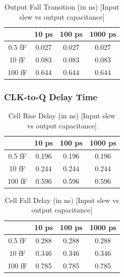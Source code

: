 \documentclass[12pt]{article}
\begin{document}
\begin{table}[H]
	\centering
	\begin{tabular}{|c|c|c|c|}
		\hline
		       & 10 ps & 100 ps & 1000 ps \\ \hline
		0.5 fF & 0.027 & 0.027  & 0.027   \\ \hline
		10 fF  & 0.083 & 0.083  & 0.083   \\ \hline
		100 fF & 0.644 & 0.644  & 0.644   \\ \hline
	\end{tabular}
	\caption{Output Fall Transition (in ns) [Input slew vs output capacitance]}
\end{table}

\subsubsection{CLK-to-Q Delay Time}

\begin{table}[H]
	\centering
	\begin{tabular}{|c|c|c|c|}
		\hline
		       & 10 ps & 100 ps & 1000 ps \\ \hline
		0.5 fF & 0.196 & 0.196  & 0.196   \\ \hline
		10 fF  & 0.244 & 0.244  & 0.244   \\ \hline
		100 fF & 0.596 & 0.596  & 0.596   \\ \hline
	\end{tabular}
	\caption{Cell Rise Delay (in ns) [Input slew vs output capacitance]}
\end{table}

\begin{table}[H]
	\centering
	\begin{tabular}{|c|c|c|c|}
		\hline
		       & 10 ps & 100 ps & 1000 ps \\ \hline
		0.5 fF & 0.288 & 0.288  & 0.288   \\ \hline
		10 fF  & 0.346 & 0.346  & 0.346   \\ \hline
		100 fF & 0.785 & 0.785  & 0.785   \\ \hline
	\end{tabular}
	\caption{Cell Fall Delay (in ns) [Input slew vs output capacitance]}
\end{table}

\end{document}
